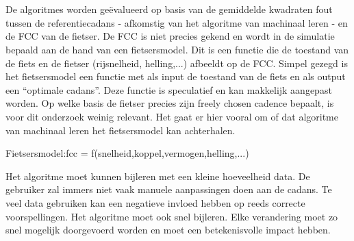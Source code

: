 \\\\
De algoritmes worden geëvalueerd op basis van de gemiddelde kwadraten fout tussen de referentiecadans - afkomstig van het algoritme van machinaal leren - en de FCC van de fietser. De FCC is niet precies gekend en wordt in de simulatie bepaald aan de hand van een fietsersmodel. Dit is een functie die de toestand van de fiets en de fietser (rijsnelheid, helling,...) afbeeldt op de FCC. Simpel gezegd is het fietsersmodel een functie met als input de toestand van de fiets en als output een “optimale cadans”. Deze functie is speculatief en kan makkelijk aangepast worden. Op welke basis de fietser precies zijn freely chosen cadence bepaalt, is voor dit onderzoek weinig relevant. Het gaat er hier vooral om of dat algoritme van machinaal leren het fietsersmodel kan achterhalen.
\\
\begin{center}
Fietsersmodel:\tab fcc = f(snelheid,koppel,vermogen,helling,...)
\end{center}
Het algoritme moet kunnen bijleren met een kleine hoeveelheid data. De gebruiker zal immers niet vaak manuele aanpassingen doen aan de cadans. Te veel data gebruiken kan een negatieve invloed hebben op reeds correcte voorspellingen. Het algoritme moet ook snel bijleren. Elke verandering moet zo snel mogelijk doorgevoerd worden en moet een betekenisvolle impact hebben.
